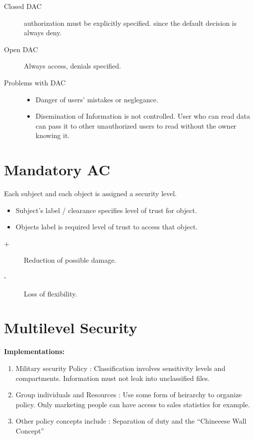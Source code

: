 \documentclass[a4paper,10pt]{scrreprt}
\begin{document}
\begin{description}
 \item [Closed DAC] authorization must be explicitly specified. since the default decision is always deny.
 \item [Open DAC] Always access, denials specified. 
 \item [Problems with DAC] \begin{itemize}
                            \item Danger of users' mistakes or neglegance. 
                            \item Disemination of Information is not controlled. User who can read data can pass it to 
other unauthorized users to read without the owner knowing it. 
                           \end{itemize}

\end{description}

\section{Mandatory AC}
\begin{framed}
 Each subject and each object is assigned a security level. 
 \begin{itemize}
  \item Subject's label / clearance specifies level of trust for object. 
  \item Objects label is required level of trust to access that object. 
 \end{itemize}

\end{framed}
\begin{description}
 \item [+] Reduction of possible damage. 
 \item [-] Loss of flexibility.
\end{description}

\section{Multilevel Security}
\textbf{Implementations:}
\begin{enumerate}
 \item Military security Policy : Classification involves sensitivity levels and compartments. Information must not 
leak into unclassified files. 
\item Group individuals and Resources : Use some form of heirarchy to organize policy. Only marketing people can have 
access to sales statistics for example. 
\item Other policy concepts include : Separation of duty and the ``Chineeese Wall Concept''
\end{enumerate}
\end{document}
